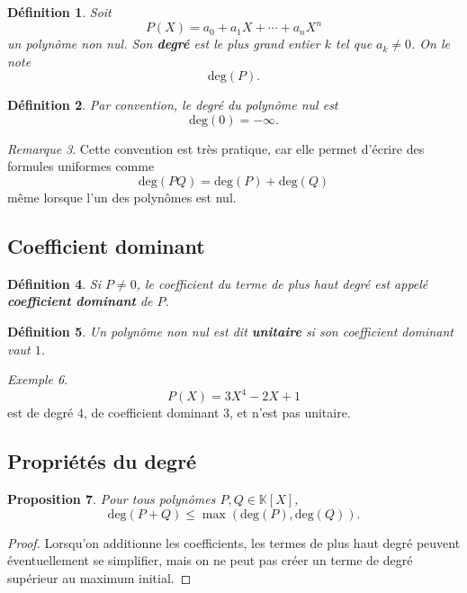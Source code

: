 \documentclass[11pt,a4paper]{article}
\newtheorem{definition}{Définition}[section]
\newtheorem{proposition}[definition]{Proposition}
\theoremstyle{remark}
\newtheorem{remarque}[definition]{Remarque}
\newtheorem{exemple}[definition]{Exemple}
\newcommand{\K}{\mathbb{K}}
\newcommand{\degP}{\mathrm{deg}}
\begin{document}
\begin{definition}
Soit
\[
P(X)=a_0+a_1X+\cdots+a_nX^n
\]
un polynôme non nul. Son \textbf{degré} est le plus grand entier \(k\) tel que \(a_k\neq 0\). On le note
\[
\degP(P).
\]
\end{definition}

\begin{definition}
Par convention, le degré du polynôme nul est
\[
\degP(0)=-\infty.
\]
\end{definition}

\begin{remarque}
Cette convention est très pratique, car elle permet d’écrire des formules uniformes comme
\[
\degP(PQ)=\degP(P)+\degP(Q)
\]
même lorsque l’un des polynômes est nul.
\end{remarque}

\subsection{Coefficient dominant}

\begin{definition}
Si \(P\neq 0\), le coefficient du terme de plus haut degré est appelé \textbf{coefficient dominant} de \(P\).
\end{definition}

\begin{definition}
Un polynôme non nul est dit \textbf{unitaire} si son coefficient dominant vaut \(1\).
\end{definition}

\begin{exemple}
\[
P(X)=3X^4-2X+1
\]
est de degré \(4\), de coefficient dominant \(3\), et n’est pas unitaire.
\end{exemple}

\subsection{Propriétés du degré}

\begin{proposition}
Pour tous polynômes \(P,Q\in\K[X]\),
\[
\degP(P+Q)\le \max(\degP(P),\degP(Q)).
\]
\end{proposition}

\begin{proof}
Lorsqu’on additionne les coefficients, les termes de plus haut degré peuvent éventuellement se simplifier, mais on ne peut pas créer un terme de degré supérieur au maximum initial.
\end{proof}
\end{document}
